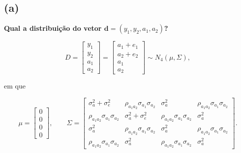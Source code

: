 \documentclass[12pt, oldfontcommands]{article}\usepackage[]{graphicx}\usepackage[]{color}
\begin{document}
\subsection*{(a)} 

\textbf{Qual a distribuição do vetor
        \(\textbf{d} = (y_{1}, y_{2}, a_{1}, a_{2})\)?}

\[ D = \begin{bmatrix}
        y_{1} \\
        y_{2} \\
        a_{1} \\
        a_{2}
       \end{bmatrix} = \begin{bmatrix}
                        a_{1} + e_{1} \\
                        a_{2} + e_{2} \\
                        a_{1} \\
                        a_{2}
                       \end{bmatrix} \sim N_{4} ( \mu, \Sigma), \]  

em que

\[ \mu = \begin{bmatrix}
          0 \\
          0 \\
          0 \\
          0
         \end{bmatrix}, \qquad
   \Sigma = \begin{bmatrix}
             \sigma_{a}^{2} + \sigma_{e}^{2}
             & \rho_{a_{1} a_{2}} \sigma_{a_{1}} \sigma_{a_{2}}
             & \sigma_{a}^{2}
             & \rho_{a_{1} a_{2}} \sigma_{a_{1}} \sigma_{a_{2}} \\
             \rho_{a_{1} a_{2}} \sigma_{a_{1}} \sigma_{a_{2}}
             & \sigma_{a}^{2} + \sigma_{e}^{2}
             & \rho_{a_{1} a_{2}} \sigma_{a_{1}} \sigma_{a_{2}}
             & \sigma_{a}^{2} \\
             \sigma_{a}^{2}
             & \rho_{a_{1} a_{2}} \sigma_{a_{1}} \sigma_{a_{2}}
             & \sigma_{a}^{2}
             & \rho_{a_{1} a_{2}} \sigma_{a_{1}} \sigma_{a_{2}} \\
             \rho_{a_{1} a_{2}} \sigma_{a_{1}} \sigma_{a_{2}}
             & \sigma_{a}^{2}
             & \rho_{a_{1} a_{2}} \sigma_{a_{1}} \sigma_{a_{2}}
             & \sigma_{a}^{2}
            \end{bmatrix}.
\]
\end{document}
